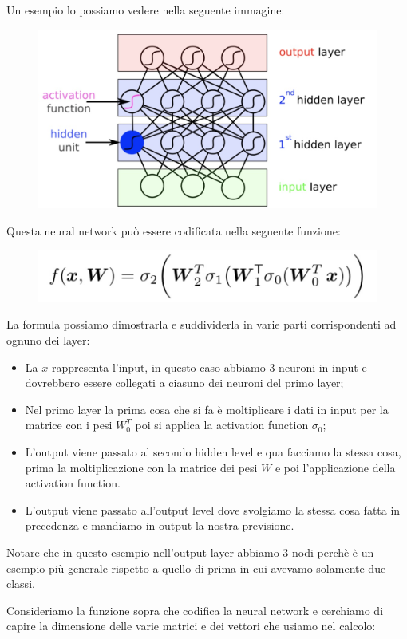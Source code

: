 \documentclass[14pt]{extreport}
\begin{document}
Un esempio lo possiamo vedere nella seguente immagine:

\begin{figure}[H]
	\centering
	\includegraphics[width=0.5\linewidth]{368.jpeg}
\end{figure}

Questa neural network può essere codificata nella seguente funzione:

\begin{figure}[H]
	\centering
	\includegraphics[width=0.7\linewidth]{369.jpeg}
\end{figure}


La formula possiamo dimostrarla e suddividerla in varie parti corrispondenti ad ognuno dei layer:
\begin{itemize}
	\item La $x$ rappresenta l'input, in questo caso abbiamo 3 neuroni in input e dovrebbero essere collegati a ciasuno dei neuroni del primo layer;
	\item Nel primo layer la prima cosa che si fa è moltiplicare i dati in input per la matrice con i pesi $W_0^T$ poi si applica la activation
	function $\sigma_0$;
	\item L'output viene passato al secondo hidden level e qua facciamo la stessa cosa, prima la moltiplicazione con la matrice dei pesi $W$ e poi
	l'applicazione della activation function.
	\item L'output viene passato all'output level dove svolgiamo la stessa cosa fatta in precedenza e mandiamo in output la nostra previsione.
\end{itemize}

Notare che in questo esempio nell'output layer abbiamo 3 nodi perchè è un esempio più generale rispetto a quello di prima in cui avevamo solamente due
classi.

Consideriamo la funzione sopra che codifica la neural network e cerchiamo di capire la dimensione delle varie matrici e dei vettori che usiamo nel
calcolo:
\end{document}
